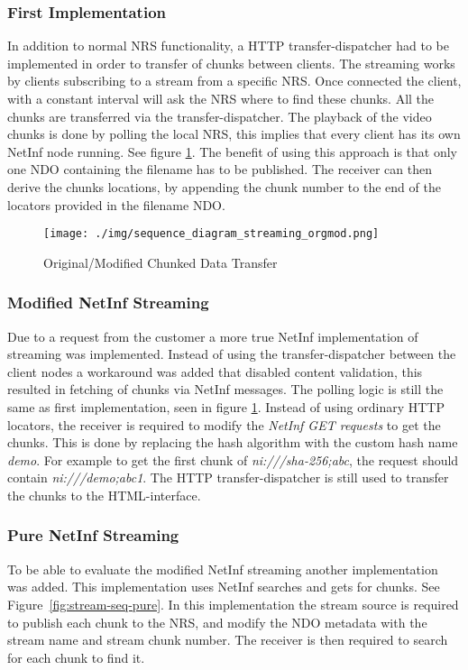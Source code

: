 \subsubsection{First Implementation}
In addition to normal NRS functionality, a HTTP transfer-dispatcher had to be implemented in order to transfer of chunks between clients. The streaming works by clients subscribing to a stream from a specific NRS. Once connected the client, with a constant interval will ask the NRS where to find these chunks. All the chunks are transferred via the transfer-dispatcher.
The playback of the video chunks is done by polling the local NRS, this implies that every client has its own NetInf node running. See figure \ref{fig:stream-seqorgmod}. The benefit of using this approach is that only one NDO containing the filename has to be published. The receiver can then derive the chunks locations, by appending the chunk number to the end of the locators provided in the filename NDO.

\begin{figure}[h!]
	\centering
		\texttt{[image: ./img/sequence\_diagram\_streaming\_orgmod.png]}
    	\caption{Original/Modified Chunked Data Transfer}
	\label{fig:stream-seqorgmod}
\end{figure}

\subsubsection{Modified NetInf Streaming}
Due to a request from the customer a more true NetInf implementation of streaming was implemented. Instead of using the transfer-dispatcher between the client nodes a workaround was added that disabled content validation, this resulted in fetching of chunks via NetInf messages. The polling logic is still the same as first implementation, seen in figure \ref{fig:stream-seqorgmod}. Instead of using ordinary HTTP locators, the receiver is required to modify the \textit{NetInf GET requests} to get the chunks. This is done by replacing the hash algorithm with the custom hash name \textit{demo}. For example to get the first chunk of \textit{ni:///sha-256;abc}, the request should contain \textit{ni:///demo;abc1}. The HTTP transfer-dispatcher is still used to transfer the chunks to the HTML-interface.

\subsubsection{Pure NetInf Streaming}
To be able to evaluate the modified NetInf streaming another implementation was added. This implementation uses NetInf searches and gets for chunks. See Figure~\ref{fig:stream-seq-pure}. In this implementation the stream source is required to publish each chunk to the NRS, and modify the NDO metadata with the stream name and stream chunk number. The receiver is then required to search for each chunk to find it. 

